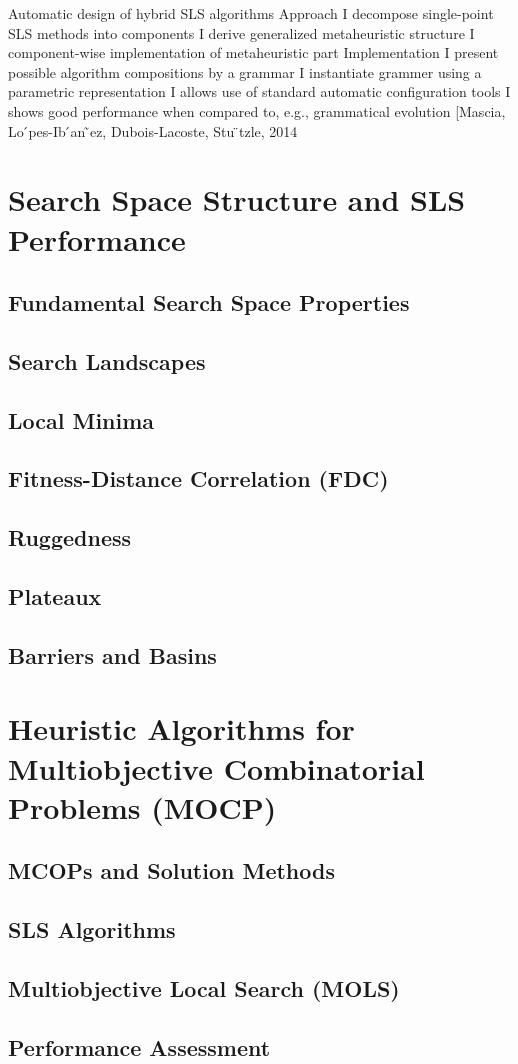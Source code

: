 \documentclass[a4paper,10pt]{article}
\begin{document}
		Automatic design of hybrid SLS algorithms
 Approach
I decompose single-point SLS methods into components I derive generalized metaheuristic structure
I component-wise implementation of metaheuristic part
Implementation
I present possible algorithm compositions by a grammar I instantiate grammer using a parametric representation
I allows use of standard automatic configuration tools
I shows good performance when compared to, e.g., grammatical
evolution [Mascia, Lo ́pes-Ib ́an ̃ez, Dubois-Lacoste, Stu ̈tzle, 2014
				
		
		
\section{Search Space Structure and SLS Performance}

	\subsection{Fundamental Search Space Properties}
	
	\subsection{Search Landscapes}
	
	\subsection{Local Minima}
	
	\subsection{Fitness-Distance Correlation (FDC)}
	
	\subsection{Ruggedness}
	
	\subsection{Plateaux}
	
	\subsection{Barriers and Basins}
	
\section{Heuristic Algorithms for Multiobjective Combinatorial Problems (MOCP)}
	\subsection{MCOPs and Solution Methods}
		\subsection{SLS Algorithms}
		
	
	\subsection{Multiobjective Local Search (MOLS)}
	
		
	
	\subsection{Performance Assessment}
	
\end{document}
